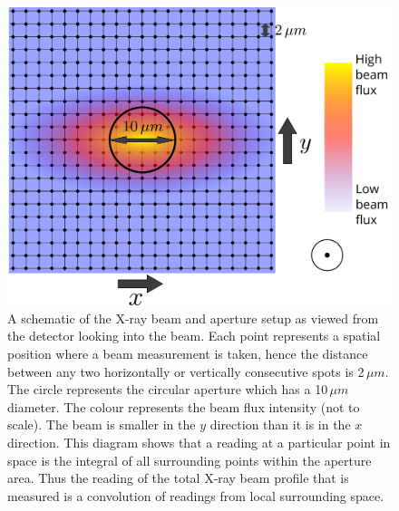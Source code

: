 \begin{figure}
    \centering
    \includegraphics[width=1\textwidth]{figures/beam/aperture_scan_drawing.pdf}
    \caption[A schematic of the X-ray beam and aperture setup.]{A schematic of the X-ray beam and aperture setup as viewed from the detector looking into the beam.
    Each point represents a spatial position where a beam measurement is taken, hence the distance between any two horizontally or vertically consecutive spots is 2$\,\mu m$.
    The circle represents the circular aperture which has a 10$\,\mu m$ diameter.
    The colour represents the beam flux intensity (not to scale).
    The beam is smaller in the $y$ direction than it is in the $x$ direction.
    This diagram shows that a reading at a particular point in space is the integral of all surrounding points within the aperture area.
    Thus the reading of the total X-ray beam profile that is measured is a convolution of readings from local surrounding space.}
    \label{fig:Aperture scan model - DLS}
\end{figure}

